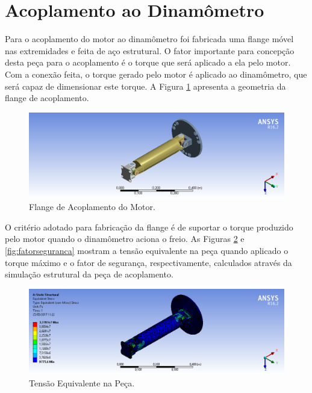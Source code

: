 \pagebreak

\section{Acoplamento ao Dinamômetro}

Para o acoplamento do motor ao dinamômetro foi fabricada uma flange móvel nas extremidades e feita de aço estrutural. O fator importante para concepção desta peça para o acoplamento é o torque que será aplicado a ela pelo motor. Com a conexão feita, o torque gerado pelo motor é aplicado ao dinamômetro, que será capaz de dimensionar este torque. A Figura \ref{fig:flange} apresenta a geometria da flange de acoplamento.

\begin{figure}[h!]
	\centering
	\includegraphics[keepaspectratio=true,scale= 0.35]{figuras/Geometria.png}
	\caption{Flange de Acoplamento do Motor.}
	\label{fig:flange}
\end{figure}

O critério adotado para fabricação da flange é de suportar o torque produzido pelo motor quando o dinamômetro aciona o freio. As Figuras \ref{fig:tesaoequivalente} e \ref{fig:fatorseguranca} mostram a tensão equivalente na peça quando aplicado o torque máximo e o fator de segurança, respectivamente, calculados através da simulação estrutural da peça de acoplamento.


\begin{figure}[h!]
	\centering
	\includegraphics[keepaspectratio=true,scale= 0.35]{figuras/Tensao_Equivalente.png}
	\caption{Tensão Equivalente na Peça.}
	\label{fig:tesaoequivalente}
\end{figure}

